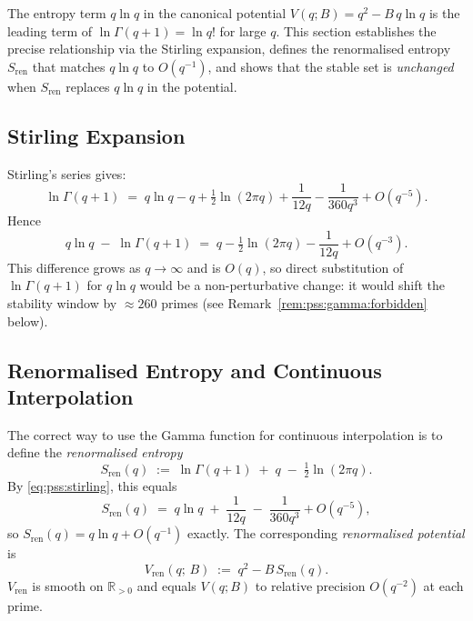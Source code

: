 \documentclass[12pt,a4paper]{article}
\theoremstyle{definition}
\theoremstyle{remark}
\begin{document}
The entropy term $q\ln q$ in the canonical potential
$V(q;B) = q^2 - B\,q\ln q$ is the leading term of $\ln\Gamma(q+1) = \ln q!$
for large $q$.  This section establishes the precise relationship via the
Stirling expansion, defines the renormalised entropy $S_{\mathrm{ren}}$ that
matches $q\ln q$ to $O(q^{-1})$, and shows that the stable set is
\emph{unchanged} when $S_{\mathrm{ren}}$ replaces $q\ln q$ in the potential.

\subsection{Stirling Expansion}
\label{sec:pss:gamma:stirling}

Stirling's series gives:
\begin{equation}
  \ln\Gamma(q+1) \;=\; q\ln q - q + \tfrac{1}{2}\ln(2\pi q)
    + \frac{1}{12q} - \frac{1}{360q^3} + O(q^{-5}).
  \label{eq:pss:stirling}
\end{equation}
Hence
\begin{equation}
  q\ln q \;-\; \ln\Gamma(q+1) \;=\; q - \tfrac{1}{2}\ln(2\pi q)
    - \frac{1}{12q} + O(q^{-3}).
  \label{eq:pss:stirling-diff}
\end{equation}
This difference grows as $q\to\infty$ and is $O(q)$, so direct substitution of
$\ln\Gamma(q+1)$ for $q\ln q$ would be a non-perturbative change: it would
shift the stability window by $\approx 260$ primes (see
Remark~\ref{rem:pss:gamma:forbidden} below).

\subsection{Renormalised Entropy and Continuous Interpolation}
\label{sec:pss:gamma:sren}

The correct way to use the Gamma function for continuous interpolation is to
define the \emph{renormalised entropy}
\begin{equation}
  S_{\mathrm{ren}}(q) \;:=\; \ln\Gamma(q+1) \;+\; q \;-\; \tfrac{1}{2}\ln(2\pi q).
  \label{eq:pss:Sren}
\end{equation}
By \eqref{eq:pss:stirling}, this equals
\begin{equation}
  S_{\mathrm{ren}}(q) \;=\; q\ln q \;+\; \frac{1}{12q} \;-\; \frac{1}{360q^3} + O(q^{-5}),
  \label{eq:pss:Sren-expand}
\end{equation}
so $S_{\mathrm{ren}}(q) = q\ln q + O(q^{-1})$ exactly.
The corresponding \emph{renormalised potential} is
\begin{equation}
  V_{\mathrm{ren}}(q;\,B) \;:=\; q^2 - B\,S_{\mathrm{ren}}(q).
  \label{eq:pss:Vren}
\end{equation}
$V_{\mathrm{ren}}$ is smooth on $\mathbb{R}_{>0}$ and equals $V(q;B)$ to relative
precision $O(q^{-2})$ at each prime.
\end{document}
